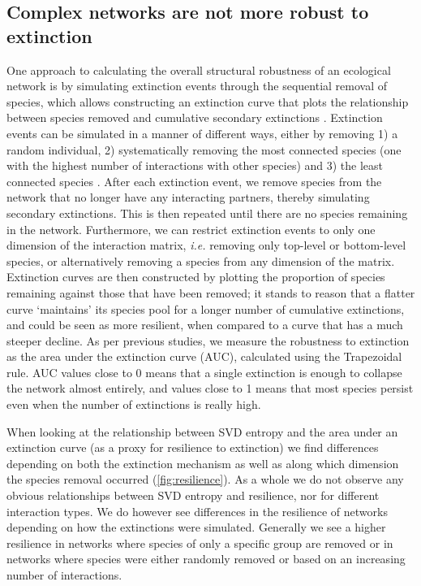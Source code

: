 \subsection{Complex networks are not more robust to
extinction}\label{complex-networks-are-not-more-robust-to-extinction}

One approach to calculating the overall structural robustness of an ecological
network is by simulating extinction events through the sequential removal of
species, which allows constructing an extinction curve that plots the
relationship between species removed and cumulative secondary extinctions
\cite{Dunne2002NetStr, Memmott2004TolPol}. Extinction events can be simulated in
a manner of different ways, either by removing 1) a random individual, 2)
systematically removing the most connected species (one with the highest number
of interactions with other species) and 3) the least connected species
\cite{Dunne2002NetStr}. After each extinction event, we remove species from the
network that no longer have any interacting partners, thereby simulating
secondary extinctions. This is then repeated until there are no species
remaining in the network. Furthermore, we can restrict extinction events to only
one dimension of the interaction matrix, \emph{i.e.} removing only top-level or
bottom-level species, or alternatively removing a species from any dimension of
the matrix. Extinction curves are then constructed by plotting the proportion of
species remaining against those that have been removed; it stands to reason that
a flatter curve `maintains' its species pool for a longer number of cumulative
extinctions, and could be seen as more resilient, when compared to a curve that
has a much steeper decline. As per previous studies, we measure the robustness
to extinction as the area under the extinction curve (AUC), calculated using the
Trapezoidal rule. AUC values close to 0 means that a single extinction is enough
to collapse the network almost entirely, and values close to 1 means that most
species persist even when the number of extinctions is really high.

When looking at the relationship between SVD entropy and the area under an
extinction curve (as a proxy for resilience to extinction) we find differences
depending on both the extinction mechanism as well as along which dimension the
species removal occurred (\autoref{fig:resilience}). As a whole we do not
observe any obvious relationships between SVD entropy and resilience, nor for
different interaction types. We do however see differences in the resilience of
networks depending on how the extinctions were simulated. Generally we see a
higher resilience in networks where species of only a specific group are removed
or in networks where species were either randomly removed or based on an
increasing number of interactions.

